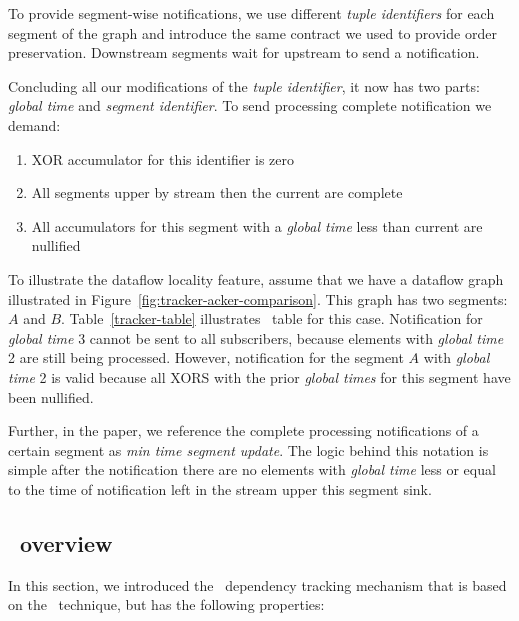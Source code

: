 To provide segment-wise notifications, we use different \textit{tuple identifiers} for each segment of the graph and introduce the same contract we used to provide order preservation. Downstream segments wait for upstream to send a notification. 

Concluding all our modifications of the \textit{tuple identifier}, it now has two parts: \textit{global time} and \textit{segment identifier}. To send processing complete notification we demand:
\begin{enumerate}
    \item XOR accumulator for this identifier is zero
    \item All segments upper by stream then the current are complete
    \item All accumulators for this segment with a  \textit{global time} less than current are nullified
\end{enumerate}

To illustrate the dataflow locality feature, assume that we have a dataflow graph illustrated in Figure~\ref{fig:tracker-acker-comparison}. This graph has two segments: $A$ and $B$. Table~\ref{tracker-table} illustrates \tracker\ table for this case. Notification for \textit{global time} 3 cannot be sent to all subscribers, because elements with \textit{global time} 2 are still being processed. However, notification for the segment $A$ with \textit{global time} 2 is valid because all XORS with the prior \textit{global times} for this segment have been nullified.

Further, in the paper, we reference the complete processing notifications of a certain segment as \textit{min time segment update}. The logic behind this notation is simple after the notification there are no elements with \textit{global time} less or equal to the time of notification left in the stream upper this segment sink.  

\subsection{\tracker\ overview}

In this section, we introduced the \tracker\ dependency tracking mechanism that is based on the \acker\ technique, but has the following properties:

